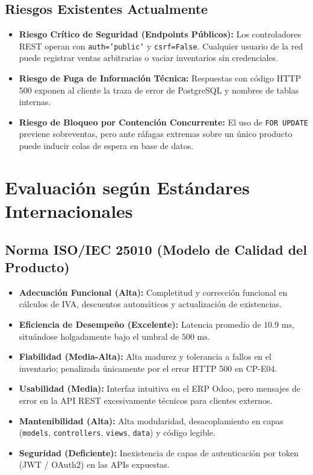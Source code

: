 \documentclass{article}
\begin{document}
\subsection{Riesgos Existentes Actualmente}
\begin{itemize}[leftmargin=*]
\item \textbf{Riesgo Crítico de Seguridad (Endpoints Públicos):} Los controladores REST operan con \texttt{auth='public'} y \texttt{csrf=False}. Cualquier usuario de la red puede registrar ventas arbitrarias o vaciar inventarios sin credenciales.
\item \textbf{Riesgo de Fuga de Información Técnica:} Respuestas con código HTTP 500 exponen al cliente la traza de error de PostgreSQL y nombres de tablas internas.
\item \textbf{Riesgo de Bloqueo por Contención Concurrente:} El uso de \texttt{FOR UPDATE} previene sobreventas, pero ante ráfagas extremas sobre un único producto puede inducir colas de espera en base de datos.
\end{itemize}

\section{Evaluación según Estándares Internacionales}

\subsection{Norma ISO/IEC 25010 (Modelo de Calidad del Producto)}
\begin{itemize}[leftmargin=*]
\item \textbf{Adecuación Funcional (Alta):} Completitud y corrección funcional en cálculos de IVA, descuentos automáticos y actualización de existencias.
\item \textbf{Eficiencia de Desempeño (Excelente):} Latencia promedio de $10.9\text{ ms}$, situándose holgadamente bajo el umbral de $500\text{ ms}$.
\item \textbf{Fiabilidad (Media-Alta):} Alta madurez y tolerancia a fallos en el inventario; penalizada únicamente por el error HTTP 500 en CP-E04.
\item \textbf{Usabilidad (Media):} Interfaz intuitiva en el ERP Odoo, pero mensajes de error en la API REST excesivamente técnicos para clientes externos.
\item \textbf{Mantenibilidad (Alta):} Alta modularidad, desacoplamiento en capas (\texttt{models}, \texttt{controllers}, \texttt{views}, \texttt{data}) y código legible.
\item \textbf{Seguridad (Deficiente):} Inexistencia de capas de autenticación por token (JWT / OAuth2) en las APIs expuestas.
\end{itemize}
\end{document}
